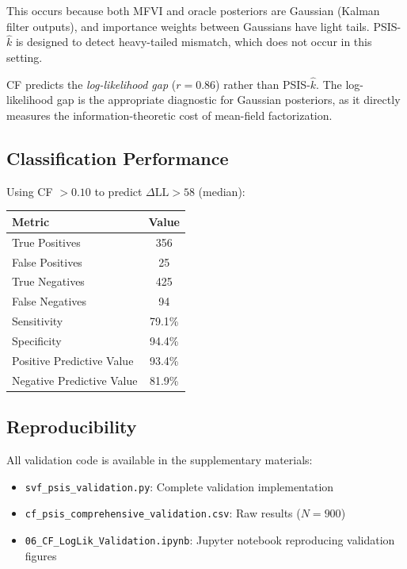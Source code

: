 \documentclass[10pt]{article} %
\theoremstyle{plain}
\theoremstyle{definition}
\begin{document}
This occurs because both MFVI and oracle posteriors are Gaussian (Kalman filter outputs), and importance weights between Gaussians have light tails. PSIS-$\hat{k}$ is designed to detect heavy-tailed mismatch, which does not occur in this setting.

\begin{tcolorbox}[colback=blue!5!white, colframe=blue!50!black, title=Methodological Note]
CF predicts the \emph{log-likelihood gap} ($r = 0.86$) rather than PSIS-$\hat{k}$. The log-likelihood gap is the appropriate diagnostic for Gaussian posteriors, as it directly measures the information-theoretic cost of mean-field factorization.
\end{tcolorbox}

\subsection{Classification Performance}

Using CF $> 0.10$ to predict $\Delta\text{LL} > 58$ (median):

\begin{center}
\begin{tabular}{lc}
\toprule
Metric & Value \\
\midrule
True Positives & 356 \\
False Positives & 25 \\
True Negatives & 425 \\
False Negatives & 94 \\
\midrule
Sensitivity & 79.1\% \\
Specificity & 94.4\% \\
Positive Predictive Value & 93.4\% \\
Negative Predictive Value & 81.9\% \\
\bottomrule
\end{tabular}
\end{center}

\subsection{Reproducibility}

All validation code is available in the supplementary materials:
\begin{itemize}[nosep]
    \item \texttt{svf\_psis\_validation.py}: Complete validation implementation
    \item \texttt{cf\_psis\_comprehensive\_validation.csv}: Raw results ($N = 900$)
    \item \texttt{06\_CF\_LogLik\_Validation.ipynb}: Jupyter notebook reproducing validation figures
\end{itemize}
\end{document}
